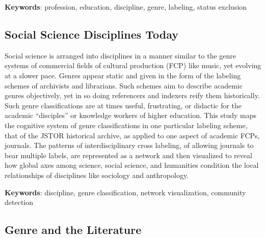 \documentclass[]{book}
\theoremstyle{definition}
\theoremstyle{definition}
\theoremstyle{definition}
\theoremstyle{remark}
\begin{document}
\textbf{Keywords}: profession, education, discipline, genre, labeling, status
exclusion

\hypertarget{social-science-disciplines-today}{%
\subsection{Social Science Disciplines
Today}\label{social-science-disciplines-today}}

















Social science is arranged into disciplines in a manner
similar to the genre systems of commercial fields of cultural production
(FCP) like music, yet evolving at a slower pace. Genres appear static
and given in the form of the labeling schemes of archivists and
librarians. Such schemes aim to describe academic genres objectively,
yet in so doing referencers and indexers reify them historically. Such
genre classifications are at times useful, frustrating, or didactic for
the academic ``disciples'' or knowledge workers of higher education.
This study maps the cognitive system of genre classifications in one
particular labeling scheme, that of the JSTOR historical archive, as
applied to one aspect of academic FCPs, journals. The patterns of
interdisciplinary cross labeling, of allowing journals to bear multiple
labels, are represented as a network and then visualized to reveal how
global axes among science, social science, and humanities condition the
local relationships of disciplines like sociology and anthropology.




\textbf{Keywords}: discipline, genre classification, network visualization,
community detection

\hypertarget{genre-and-the-literature}{%
\subsection{Genre and the Literature}\label{genre-and-the-literature}}
\end{document}
